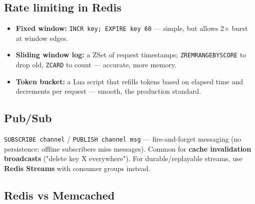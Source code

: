 \documentclass[11pt]{article}
\providecommand{\tightlist}{\setlength{\itemsep}{1pt}\setlength{\parskip}{0pt}}
\begin{document}
\subsection{Rate limiting in Redis}\label{rate-limiting-in-redis}

\begin{itemize}
\tightlist
\item
  \textbf{Fixed window:} \texttt{INCR\ key;\ EXPIRE\ key\ 60} --- simple, but allows 2\(\times\) burst at window edges.
\item
  \textbf{Sliding window log:} a ZSet of request timestamps; \texttt{ZREMRANGEBYSCORE} to drop old, \texttt{ZCARD} to count --- accurate, more memory.
\item
  \textbf{Token bucket:} a Lua script that refills tokens based on elapsed time and decrements per request --- smooth, the production standard.
\end{itemize}

\subsection{Pub/Sub}\label{pubsub}

\texttt{SUBSCRIBE\ channel} / \texttt{PUBLISH\ channel\ msg} --- fire-and-forget messaging (no persistence; offline subscribers miss messages). Common for \textbf{cache invalidation broadcasts} ("delete key X everywhere"). For durable/replayable streams, use \textbf{Redis Streams} with consumer groups instead.

\subsection{Redis vs Memcached}\label{redis-vs-memcached}
\end{document}
